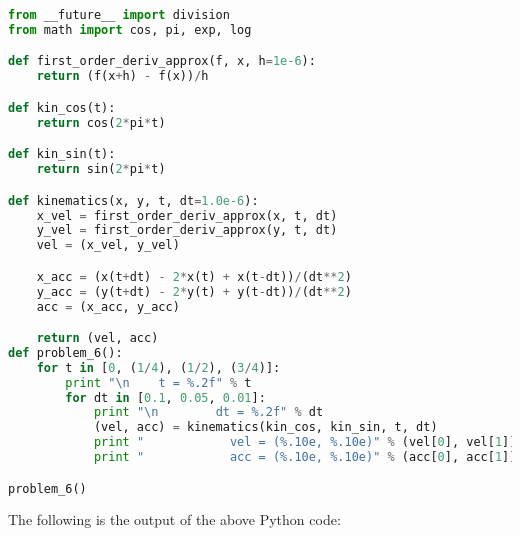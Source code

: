\documentclass[12pt]{article}
\begin{document}
\begin{lstlisting}[language=Python, caption=Problem 3 source code]
from __future__ import division
from math import cos, pi, exp, log

def first_order_deriv_approx(f, x, h=1e-6):
    return (f(x+h) - f(x))/h

def kin_cos(t):
    return cos(2*pi*t)

def kin_sin(t):
    return sin(2*pi*t)

def kinematics(x, y, t, dt=1.0e-6):
    x_vel = first_order_deriv_approx(x, t, dt)
    y_vel = first_order_deriv_approx(y, t, dt)
    vel = (x_vel, y_vel)

    x_acc = (x(t+dt) - 2*x(t) + x(t-dt))/(dt**2)
    y_acc = (y(t+dt) - 2*y(t) + y(t-dt))/(dt**2)
    acc = (x_acc, y_acc)

    return (vel, acc)
def problem_6():
    for t in [0, (1/4), (1/2), (3/4)]:
        print "\n    t = %.2f" % t
        for dt in [0.1, 0.05, 0.01]:
            print "\n        dt = %.2f" % dt
            (vel, acc) = kinematics(kin_cos, kin_sin, t, dt)
            print "            vel = (%.10e, %.10e)" % (vel[0], vel[1])
            print "            acc = (%.10e, %.10e)" % (acc[0], acc[1])

problem_6()
\end{lstlisting}
The following is the output of the above Python code:
\end{document}
